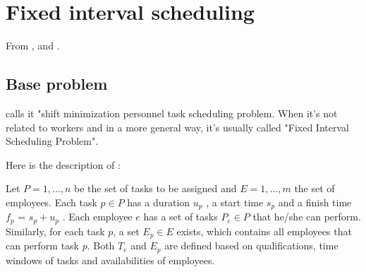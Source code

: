 \documentclass[a4paper,11pt]{article}
\begin{document}



\clearpage

\section{Fixed interval scheduling}

    From \cite{Smet2015}, \cite{Kolen2007} and \cite{Kovalyov2007}.


    \subsection{Base problem}

    \cite{Smet2015} calls it "shift minimization personnel task scheduling problem. When it's not related to workers and in a more general way, it's usually called "Fixed Interval Scheduling Problem".

    Here is the description of \cite{Smet2015}:

    Let $P = {1, ..., n}$ be the set of tasks to be assigned and $E = {1, ..., m}$ the set of employees. Each task $p \in P$ has a duration $u_p$ , a start time $s_p$ and a finish time $f_p$ = $s_p + u_p$ . Each employee $e$ has a set of tasks $P_e \in P$ that he/she can perform. Similarly, for each task $p$, a set $E_p \in E$ exists, which contains all employees that can perform task $p$. Both $T_e$ and $E_p$ are defined based on qualifications, time windows of tasks and availabilities of employees.
\end{document}
